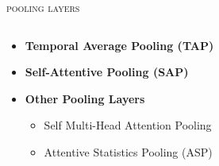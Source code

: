 \documentclass[10pt,aspectratio=1610,professionalfont]{beamer}
\begin{document}
\begin{frame}{\textsc{pooling layers}}
	\begin{columns}
		\begin{column}{0.4\textwidth}
		\begin{itemize}
	        \item \textbf{Temporal Average Pooling (TAP)}
		  \item \textbf{Self-Attentive Pooling (SAP)}
		\item \textbf{Other Pooling Layers}
	        \begin{itemize}
	            \item Self Multi-Head Attention Pooling
	            \item Attentive Statistics Pooling (ASP) 
	        \end{itemize}
	    \end{itemize}
		\end{column}
		\begin{column}{0.3\textwidth} 
		\begin{center}

\end{center}
\end{column}
\end{columns}
\end{frame}
\end{document}

